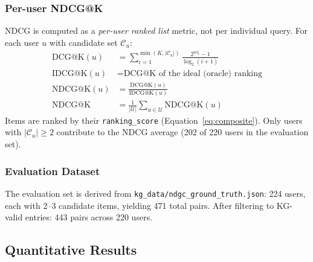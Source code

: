 \documentclass[12pt,a4paper]{article}
\begin{document}
\subsubsection{Per-user NDCG@K}
NDCG is computed as a \emph{per-user ranked list} metric, not per individual query.
For each user $u$ with candidate set $\mathcal{C}_u$:
\begin{align}
  \text{DCG@K}(u) &= \sum_{i=1}^{\min(K, |\mathcal{C}_u|)}
                    \frac{2^{\text{rel}_i} - 1}{\log_2(i+1)} \\
  \text{IDCG@K}(u) &= \text{DCG@K of the ideal (oracle) ranking} \\
  \text{NDCG@K}(u) &= \frac{\text{DCG@K}(u)}{\text{IDCG@K}(u)} \\
  \text{NDCG@K} &= \frac{1}{|\mathcal{U}|} \sum_{u \in \mathcal{U}} \text{NDCG@K}(u)
\end{align}
Items are ranked by their \texttt{ranking\_score} (Equation~\ref{eq:composite}).
Only users with $|\mathcal{C}_u| \geq 2$ contribute to the NDCG average
(202 of 220 users in the evaluation set).

\subsubsection{Evaluation Dataset}
The evaluation set is derived from \texttt{kg\_data/ndgc\_ground\_truth.json}:
224 users, each with 2--3 candidate items, yielding 471 total pairs.
After filtering to KG-valid entries: 443 pairs across 220 users.

\subsection{Quantitative Results}
\end{document}
